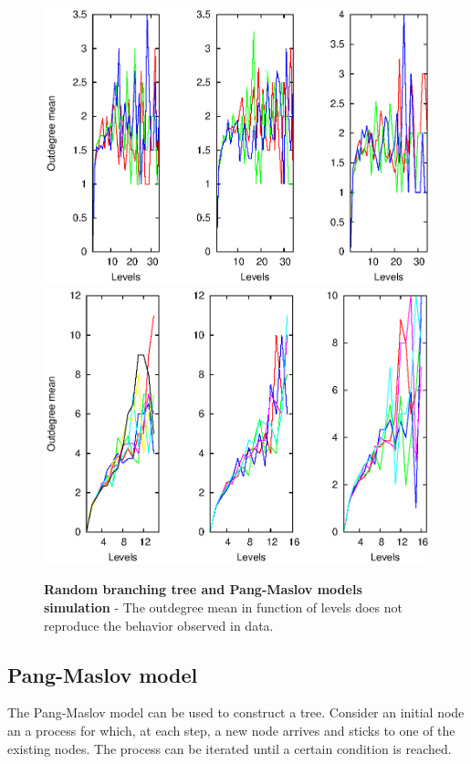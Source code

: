 \begin{figure}[p]%
\includegraphics[width=\textwidth,draft=false]{grafici/Coutdeg.yul.eps}
\includegraphics[width=\textwidth,draft=false]{grafici/Coutdeg.rus.eps}
\caption{\label{Foutrpm} \footnotesize\textbf{Random branching tree and Pang-Maslov models simulation} - The outdegree mean in function of levels does not reproduce the behavior observed in data.}
\end{figure}

\subsection{Pang-Maslov model}
The Pang-Maslov model \cite{pangmaslov} can be used to construct a tree. Consider an initial node an a process for which, at each step, a new node arrives and sticks to one of the existing nodes. The process can be iterated until a certain condition is reached.


